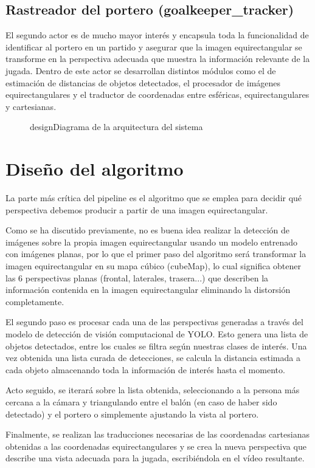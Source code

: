 \subsection{Rastreador del portero (goalkeeper\_tracker)}
El segundo actor es de mucho mayor interés y encapsula toda la funcionalidad de identificar al portero en un partido y asegurar que la imagen equirectangular se transforme en la perspectiva adecuada que muestra la información relevante de la jugada. Dentro de este actor se desarrollan distintos módulos como el de estimación de distancias de objetos detectados, el procesador de imágenes equirectangulares y el traductor de coordenadas entre esféricas, equirectangulares y cartesianas.


\begin{figure}[pie de foto]{design}{Diagrama de la arquitectura del sistema}
	\begin{center}
	\end{center}
\end{figure}

\section{Diseño del algoritmo}
La parte más crítica del pipeline es el algoritmo que se emplea para decidir qué perspectiva debemos producir a partir de una imagen equirectangular.

Como se ha discutido previamente, no es buena idea realizar la detección de imágenes sobre la propia imagen equirectangular usando un modelo entrenado con imágenes planas, por lo que el primer paso del algoritmo será transformar la imagen equirectangular en su mapa cúbico (cubeMap), lo cual significa obtener las 6 perspectivas planas (frontal, laterales, trasera...) que describen la información contenida en la imagen equirectangular eliminando la distorsión completamente.

El segundo paso es procesar cada una de las perspectivas generadas a través del modelo de detección de visión computacional de YOLO. Esto genera una lista de objetos detectados, entre los cuales se filtra según nuestras clases de interés. Una vez obtenida una lista curada de detecciones, se calcula la distancia estimada a cada objeto almacenando toda la información de interés hasta el momento.

Acto seguido, se iterará sobre la lista obtenida, seleccionando a la persona más cercana a la cámara y triangulando entre el balón (en caso de haber sido detectado) y el portero o simplemente ajustando la vista al portero.

Finalmente, se realizan las traducciones necesarias de las coordenadas cartesianas obtenidas a las coordenadas equirectangulares y se crea la nueva perspectiva que describe una vista adecuada para la jugada, escribiéndola en el vídeo resultante.
